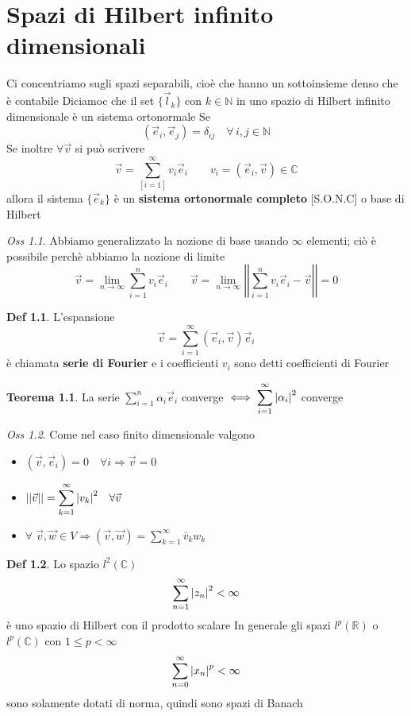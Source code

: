 \documentclass[a4paper,11pt]{report}
\theoremstyle{remark}
\newtheorem*{oss}{Oss}
\theoremstyle{definition}
\newtheorem*{teo}{Teorema}
\newtheorem*{Def}{Def}
\newcommand{\C}{\mathbb{C}}
\newcommand{\R}{\mathbb{R}}
\DeclarePairedDelimiter{\abs}{\lvert}{\rvert}
\begin{document}
\chapter{Spazi di Hilbert infinito dimensionali}
Ci concentriamo sugli spazi separabili, cioè che hanno un sottoinsieme denso che è contabile \newline
Diciamoc che il set $\{\vec{l}_k\}$ con $k\in \mathbb{N}$ in uno spazio di Hilbert infinito dimensionale è un sistema ortonormale Se
\[(\vec{e}_i,\vec{e}_j) = \delta_{ij} \quad \forall \, i,j \in \mathbb{N} \]
Se inoltre $\forall \vec{v}$ si può scrivere
\[\vec{v} = \sum_[i=1]^\infty v_i\vec{e}_i \qquad v_i = (\vec{e}_i,\vec{v})\in \C\]
allora il sistema $\{\vec{e}_k\}$ è un \textbf{sistema ortonormale completo} [S.O.N.C] o base di Hilbert

\begin{oss}
	Abbiamo generalizzato la nozione di base usando $\infty$ elementi; ciò è possibile perchè abbiamo la nozione di limite
	\[\vec{v} = \lim_{n\to\infty} \sum_{i=1}^n v_i\vec{e}_i \qquad \vec{v} = \lim_{n\to\infty} \left|\left| \sum_{i=1}^n v_i\vec{e}_i - \vec{v}\right| \right| =0\] 
\end{oss}

\begin{Def} \label{Fourier}
	L'espansione 
	\[\vec{v} = \sum_{i=1}^\infty (\vec{e}_i,\vec{v})\vec{e}_i\]
	è chiamata \textbf{serie di Fourier} e i coefficienti $v_i$ sono detti coefficienti di Fourier
\end{Def}

\begin{teo}
	La serie $\displaystyle \sum_{i=1}^n \alpha_i\vec{e}_i$ converge $\iff \displaystyle \sum_{i=1}^\infty {\abs{\alpha_i}}^2$ converge 
\end{teo}

\begin{oss}
	Come nel caso finito dimensionale valgono
	\begin{itemize}
		\item $(\vec{v},\vec{e}_i) = 0 \quad \forall i \Rightarrow \vec{v}=0$
  \item $||\vec{v}|| = \displaystyle \sum_{k=1}^\infty {\abs{v_k}}^2 \quad \forall\vec{v}$
  \item $\forall \; \vec{v},\vec{w} \in V \Rightarrow (\vec{v},\vec{w}) = \displaystyle \sum_{k=1}^\infty \bar{v}_kw_k$
	\end{itemize}
\end{oss}

\begin{Def}
	Lo spazio $l^2(\C)$
	\[\sum_{n=1}^\infty {\abs{z_n}}^2 < \infty\]
	è uno spazio di Hilbert con il prodotto scalare \newline
	In generale gli spazi $l^p(\R)$ o $l^p(\C)$ con $1 \le p <\infty$
	\[\sum_{n=0}^\infty {\abs{x_n}}^p < \infty\]
	sono solamente dotati di norma, quindi sono spazi di Banach 
\end{Def}
\end{document}
